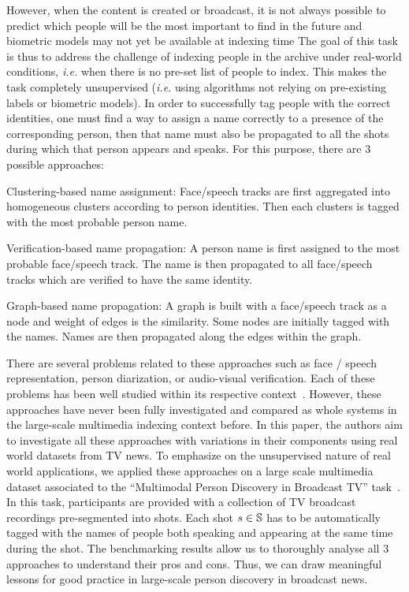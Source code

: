 However, when the content is created or broadcast, it is not always possible to predict which people will be the most important to find in the future and biometric models may not yet be available at indexing time The goal of this task is thus to address the challenge of indexing people in the archive under real-world conditions, \emph{i.e.} when there is no pre-set list of people to index.
%
This makes the task completely unsupervised (\emph{i.e.} using algorithms not relying on pre-existing labels or biometric models).
%
In order to successfully tag people with the correct identities, one must find a way to assign a name correctly to a presence of the corresponding person, then that name must also be propagated to all the shots during which that person appears and speaks. For this purpose, there are 3 possible approaches:
\begin{compactitem}
\item{Clustering-based name assignment: Face/speech tracks are first aggregated into homogeneous clusters according to person identities. Then each clusters is tagged with the most probable person name.}
\item{Verification-based name propagation: A person name is first assigned to the most probable face/speech track. The name is then propagated to all face/speech tracks which are verified to have the same identity.}
\item{Graph-based name propagation: A graph is built with a face/speech track as a node and weight of edges is the similarity. Some nodes are initially tagged with the names. Names are then propagated along the edges within the graph.}
\end{compactitem}

There are several problems related to these approaches such as face / speech representation, person diarization, or audio-visual verification. Each of these problems has been well studied within its respective context~\cite{recog,veri,rep}. 
%
However, these approaches have never been fully investigated and compared as whole systems in the large-scale multimedia indexing context before. In this paper, the authors aim to investigate all these approaches with variations in their components using real world datasets from TV news. 
%
To emphasize on the unsupervised nature of real world applications, we applied these approaches on a large scale multimedia dataset associated to the ``Multimodal Person Discovery in Broadcast TV'' task~\cite{POIGNANT--MEDIAEVAL--2015,tocite}. In this task, participants are provided with a collection of TV broadcast recordings pre-segmented into shots. Each shot $s \in \mathbb{S}$ has to be automatically tagged with the names of people both speaking and appearing at the same time during the shot.
%
The benchmarking results allow us to thoroughly analyse all 3 approaches to understand their pros and cons. Thus, we can draw meaningful lessons for good practice in large-scale person discovery in broadcast news.

\endinput
